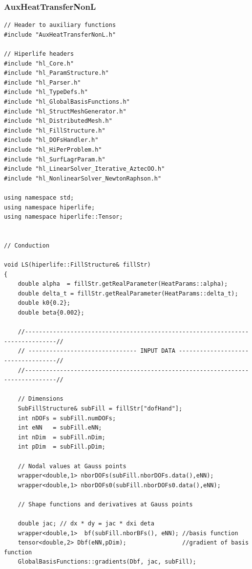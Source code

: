\documentclass[]{article}
\begin{document}
\subsubsection{AuxHeatTransferNonL} \label{sec: a.cpp}
\begin{lstlisting}
// Header to auxiliary functions
#include "AuxHeatTransferNonL.h"

// Hiperlife headers
#include "hl_Core.h"
#include "hl_ParamStructure.h"
#include "hl_Parser.h"
#include "hl_TypeDefs.h"                                                                         
#include "hl_GlobalBasisFunctions.h"                             
#include "hl_StructMeshGenerator.h"                                                                             
#include "hl_DistributedMesh.h"                                           
#include "hl_FillStructure.h"                                             
#include "hl_DOFsHandler.h"          
#include "hl_HiPerProblem.h"
#include "hl_SurfLagrParam.h"    
#include "hl_LinearSolver_Iterative_AztecOO.h"
#include "hl_NonlinearSolver_NewtonRaphson.h"

using namespace std;
using namespace hiperlife;
using namespace hiperlife::Tensor;


// Conduction

void LS(hiperlife::FillStructure& fillStr)
{
	double alpha  = fillStr.getRealParameter(HeatParams::alpha);
	double delta_t = fillStr.getRealParameter(HeatParams::delta_t);
	double k0{0.2};
	double beta{0.002};
	
	//-------------------------------------------------------------------------------//
	// ------------------------------- INPUT DATA -----------------------------------//
	//-------------------------------------------------------------------------------//
	
	// Dimensions
	SubFillStructure& subFill = fillStr["dofHand"];
	int nDOFs = subFill.numDOFs;                                        
	int eNN   = subFill.eNN;                                           
	int nDim  = subFill.nDim;                                        
	int pDim  = subFill.pDim;
	
	// Nodal values at Gauss points
	wrapper<double,1> nborDOFs(subFill.nborDOFs.data(),eNN);
	wrapper<double,1> nborDOFs0(subFill.nborDOFs0.data(),eNN);
	
	// Shape functions and derivatives at Gauss points
	
	double jac; // dx * dy = jac * dxi deta
	wrapper<double,1>  bf(subFill.nborBFs(), eNN); //basis function
	tensor<double,2> Dbf(eNN,pDim);                //gradient of basis function
	GlobalBasisFunctions::gradients(Dbf, jac, subFill);
	

\end{lstlisting}
\end{document}
